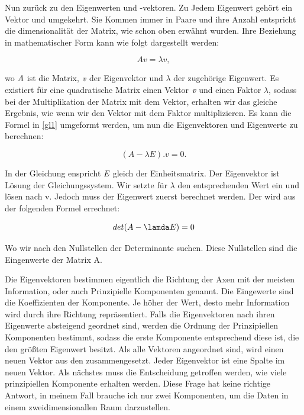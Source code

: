 Nun zurück zu den Eigenwerten und -vektoren. Zu Jedem Eigenwert gehört ein Vektor und umgekehrt. Sie Kommen immer in Paare und ihre Anzahl entspricht die dimensionalität der Matrix, wie schon oben erwähnt wurden. Ihre Beziehung in mathematischer Form kann wie folgt dargestellt werden:

\begin{equation}\label{gl1}
	Av = \lambda v,
\end{equation}

wo $\emph{A}$ ist die Matrix, $\emph{v}$ der Eigenvektor und $\lambda$ der zugehörige Eigenwert. Es existiert für eine quadratische Matrix einen Vektor $\emph{v}$ und einen Faktor $\lambda$, sodass bei der Multiplikation der Matrix mit dem Vektor, erhalten wir das gleiche Ergebnis, wie wenn wir den Vektor mit dem Faktor multiplizieren. Es kann die Formel in \ref{gl1} umgeformt werden, um nun die Eigenvektoren und Eigenwerte zu berechnen:

\begin{equation}
	(A - \lambda E).v = 0.
\end{equation}

In der Gleichung enspricht $\emph{E}$ gleich der Einheitsmatrix. Der Eigenvektor ist Lösung der Gleichungssystem. Wir setzte für $\lambda$ den entsprechenden Wert ein und lösen nach v. Jedoch muss der Eigenwert zuerst berechnet werden. Der wird aus der folgenden Formel errechnet:

\begin{equation}
	det(A - \lamda E) = 0
\end{equation}

Wo wir nach den Nullstellen der Determinante suchen. Diese Nullstellen sind die Eingenwerte der Matrix A.

Die Eigenvektoren bestimmen eigentlich die Richtung der Axen mit der meisten Information, oder auch Prinzipielle Komponenten genannt. Die Eingewerte sind die Koeffizienten der Komponente. Je höher der Wert, desto mehr Information wird durch ihre Richtung repräsentiert. Falls die Eigenvektoren nach ihren Eigenwerte absteigend geordnet sind, werden die Ordnung der Prinzipiellen Komponenten bestimmt, sodass die erste Komponente entsprechend diese ist, die den größten Eigenwert besitzt. Als alle Vektoren angeordnet sind, wird einen neuen Vektor aus den zusammengesetzt. Jeder Eigenvektor ist eine Spalte im neuen Vektor. Als nächstes muss die Entscheidung getroffen werden, wie viele prinzipiellen Komponente erhalten werden. Diese Frage hat keine richtige Antwort, in meinem Fall brauche ich nur zwei Komponenten, um die Daten in einem zweidimensionallen Raum darzustellen.


